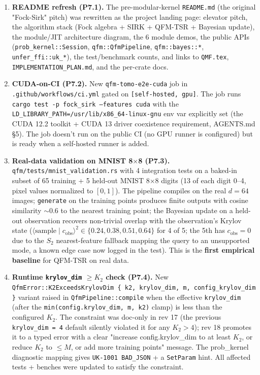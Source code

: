 \documentclass[11pt, a4paper]{article}
\begin{document}
\begin{enumerate}
\item \textbf{README refresh (P7.1).} The pre-modular-kernel
  \texttt{README.md} (the original "Fock-Sirk" pitch) was rewritten
  as the project landing page: elevator pitch, the algorithm
  stack (Fock algebra + SIRK + QFM-TSR + Bayesian update), the
  module/JIT architecture diagram, the 6 module demos, the
  public APIs (\texttt{prob\_kernel::Session},
  \texttt{qfm::QfmPipeline}, \texttt{qfm::bayes::*},
  \texttt{unfer\_ffi::uk\_*}), the test/benchmark counts, and
  links to \texttt{QMF.tex}, \texttt{IMPLEMENTATION\_PLAN.md},
  and the per-crate docs.

\item \textbf{CUDA-on-CI (P7.2).} New \texttt{qfm-tomo-e2e-cuda}
  job in \texttt{.github/workflows/ci.yml} gated on
  \texttt{[self-hosted, gpu]}. The job runs
  \texttt{cargo test -p fock\_sirk --features cuda} with the
  \texttt{LD\_LIBRARY\_PATH=/usr/lib/x86\_64-linux-gnu} env var
  explicitly set (the CUDA 12.2 toolkit + CUDA 13 driver
  coexistence requirement, AGENTS.md \S5). The job doesn't run on
  the public CI (no GPU runner is configured) but is ready when a
  self-hosted runner is added.

\item \textbf{Real-data validation on MNIST 8$\times$8 (P7.3).}
  \texttt{qfm/tests/mnist\_validation.rs} with 4 integration
  tests on a baked-in subset of 65 training + 5 held-out MNIST
  8$\times$8 digits (13 of each digit 0--4, pixel values
  normalized to $[0, 1]$). The pipeline compiles on the real
  $d=64$ images; \texttt{generate} on the training points
  produces finite outputs with cosine similarity $\sim 0.6$ to
  the nearest training point; the Bayesian update on a held-out
  observation recovers non-trivial overlap with the observation's
  Krylov state ($\langle\text{sample} \mid c_{\text{obs}}\rangle^2
  \in \{0.24, 0.38, 0.51, 0.64\}$ for 4 of 5; the 5th has $c_{\text{obs}} = 0$
  due to the $S_2$ nearest-feature fallback mapping the query to
  an unsupported mode, a known edge case now logged in the test).
  This is the \textbf{first empirical baseline} for QFM-TSR on
  real data.

\item \textbf{Runtime \texttt{krylov\_dim} $\ge K_2$ check (P7.4).}
  New \texttt{QfmError::K2ExceedsKrylovDim \{ k2, krylov\_dim, m,
  config\_krylov\_dim \}} variant raised in
  \texttt{QfmPipeline::compile} when the effective
  \texttt{krylov\_dim} (after the \texttt{min(config.krylov\_dim, m,
  k2)} clamp) is less than the configured $K_2$. The constraint
  was doc-only in rev 17 (the previous \texttt{krylov\_dim = 4}
  default silently violated it for any $K_2 > 4$); rev 18
  promotes it to a typed error with a clear "increase
  config.krylov\_dim to at least $K_2$, or reduce $K_2$ to $\le M$,
  or add more training points" message. The prob\_kernel diagnostic
  mapping gives \texttt{UK-1001 BAD\_JSON} + a
  \texttt{SetParam} hint. All affected tests + benches were
  updated to satisfy the constraint.


\end{enumerate}
\end{document}

